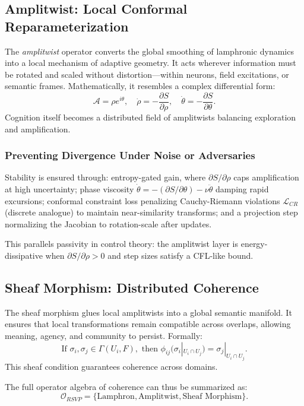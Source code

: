 \documentclass[12pt]{article}
\begin{document}
\subsection{Amplitwist: Local Conformal Reparameterization}

The \emph{amplitwist} operator converts the global smoothing of lamphronic dynamics into a local mechanism of adaptive geometry.
It acts wherever information must be rotated and scaled without distortion---within neurons, field excitations, or semantic frames.
Mathematically, it resembles a complex differential form:
\[
\mathcal{A} = \rho e^{i\theta}, \quad 
\dot{\rho} = -\frac{\partial S}{\partial \rho}, \quad
\dot{\theta} = -\frac{\partial S}{\partial \theta}.
\]
Cognition itself becomes a distributed field of amplitwists balancing exploration and amplification.

\subsubsection{Preventing Divergence Under Noise or Adversaries}

Stability is ensured through: entropy-gated gain, where $\partial S / \partial \rho$ caps amplification at high uncertainty; phase viscosity $\dot{\theta} = -(\partial S / \partial \theta) - \nu \ddot{\theta}$ damping rapid excursions; conformal constraint loss penalizing Cauchy-Riemann violations $\mathcal{L}_{CR}$ (discrete analogue) to maintain near-similarity transforms; and a projection step normalizing the Jacobian to rotation-scale after updates.

This parallels passivity in control theory: the amplitwist layer is energy-dissipative when $\partial S / \partial \rho > 0$ and step sizes satisfy a CFL-like bound.

\subsection{Sheaf Morphism: Distributed Coherence}

The sheaf morphism glues local amplitwists into a global semantic manifold.
It ensures that local transformations remain compatible across overlaps, allowing meaning, agency, and community to persist.
Formally:
\[
\text{If } \sigma_i, \sigma_j \in \Gamma(U_i, F), \text{ then } 
\phi_{ij}(\sigma_i|_{U_i \cap U_j}) = \sigma_j|_{U_i \cap U_j}.
\]
This sheaf condition guarantees coherence across domains.

The full operator algebra of coherence can thus be summarized as:
\[
\mathcal{O}_{RSVP} = \{\text{Lamphron}, \text{Amplitwist}, \text{Sheaf Morphism}\}.
\]
\end{document}

